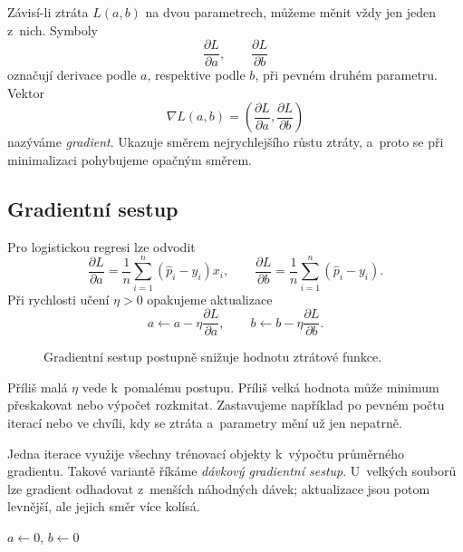 Závisí-li ztráta \(L(a,b)\) na dvou parametrech, můžeme měnit vždy jen jeden z~nich. Symboly
\[
    \frac{\partial L}{\partial a},
    \qquad
    \frac{\partial L}{\partial b}
\]
označují derivace podle \(a\), respektive podle \(b\), při pevném druhém parametru. Vektor
\[
    \nabla L(a,b)
    =
    \left(
        \frac{\partial L}{\partial a},
        \frac{\partial L}{\partial b}
    \right)
\]
nazýváme \emph{gradient}. Ukazuje směrem nejrychlejšího růstu ztráty, a~proto se při minimalizaci pohybujeme opačným směrem.

\subsection{Gradientní sestup}

Pro logistickou regresi lze odvodit
\[
    \frac{\partial L}{\partial a}
    =
    \frac1n\sum_{i=1}^{n}
    (\hat p_i-y_i)x_i,
    \qquad
    \frac{\partial L}{\partial b}
    =
    \frac1n\sum_{i=1}^{n}
    (\hat p_i-y_i).
\]
Při rychlosti učení \(\eta>0\) opakujeme aktualizace
\[
    a
    \gets
    a-\eta\frac{\partial L}{\partial a},
    \qquad
    b
    \gets
    b-\eta\frac{\partial L}{\partial b}.
\]

\begin{figure}[ht]
    \centering
    
    \caption{Gradientní sestup postupně snižuje hodnotu ztrátové funkce.}
    \label{fig:ai-gradientni-sestup}
\end{figure}

Příliš malá \(\eta\) vede k~pomalému postupu. Příliš velká hodnota může minimum přeskakovat nebo výpočet rozkmitat. Zastavujeme například po pevném počtu iterací nebo ve chvíli, kdy se ztráta a~parametry mění už jen nepatrně.

Jedna iterace využije všechny trénovací objekty k~výpočtu průměrného gradientu. Takové variantě říkáme \emph{dávkový gradientní sestup}. U~velkých souborů lze gradient odhadovat z~menších náhodných dávek; aktualizace jsou potom levnější, ale jejich směr více kolísá.

\begin{algorithm}
    \caption{\textsc{logistic-regression}}
    \label{alg:ai-logistic-regression}
    \(a\gets0\), \(b\gets0\)\\
\end{algorithm}

